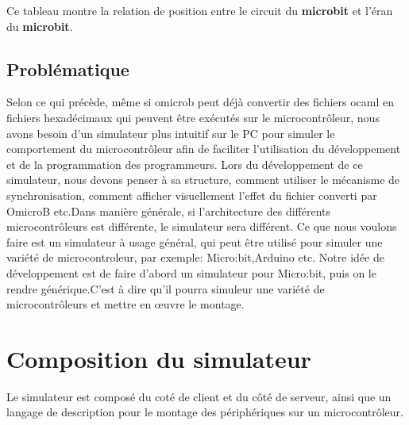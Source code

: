 \documentclass[14px]{article}
\begin{document}
Ce tableau montre la relation de position entre le circuit du  \textbf{microbit} et l'éran du \textbf{microbit}.

\begin{figure2}

\end{figure2}


\subsection{Problématique}
Selon ce qui précède, même si omicrob peut déjà convertir des fichiers ocaml en fichiers hexadécimaux qui peuvent être exécutés sur le microcontrôleur, nous avons besoin d'un simulateur plus intuitif sur le PC pour simuler le comportement du microcontrôleur afin de faciliter l'utilisation du développement et de la programmation des programmeurs. Lors du développement de ce simulateur, nous devons penser à sa structure, comment utiliser le mécanisme de synchronisation, comment afficher visuellement l'effet du fichier converti par OmicroB etc.Dans manière générale, si l'architecture des différents microcontrôleurs est différente, le simulateur sera différent. Ce que nous voulons faire est un simulateur à usage général, qui peut être utilisé pour simuler une variété de microcontroleur, par exemple: Micro:bit,Arduino etc. Notre idée de développement est de faire d'abord un simulateur pour Micro:bit, puis on le rendre générique.C'est à dire qu'il pourra simuleur une variété de microcontrôleurs et mettre en œuvre le montage.


\clearpage
\pagestyle{fancy}
\rhead{\thepage}
\fancyfoot{}


\section{Composition du simulateur}
Le simulateur est composé du coté de client et du côté de serveur, ainsi que un langage de description pour le montage des périphériques sur un microcontrôleur.
\end{document}
